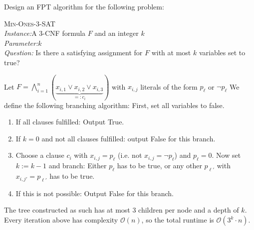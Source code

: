 \documentclass{article}
\begin{document}
\begin{exercise}
    Design an FPT algorithm for the following problem:
    \begin{mdframed} \textsc{Min-Ones-3-SAT} \\
        \textit{Instance:}A 3-CNF formula $F$ and an integer $k$\\
\textit{Parameter:}$k$\\
\textit{Question:} Is there a satisfying assignment for $F$ with at most $k$ variables set to true?
  \end{mdframed}
\end{exercise}
\begin{solving}
    Let $F = \bigwedge_{i=1}^n(\underbrace{x_{i,1}\lor x_{i,2}\lor x_{i,3}}_{=: c_i})$ with $x_{i,j}$ literals of the form $p_\ell$ or $\lnot p_\ell$
    We define the following branching algorithm: First, set all variables to false.
    \begin{enumerate}
        \item If all clauses fulfilled: Output True.
        \item If $k=0$ and not all clauses fulfilled: output False for this branch.
        \item Choose a clause $c_i$ with $x_{i,j} = p_\ell$ (i.e. not $x_{i,j} = \lnot p_\ell$) and $p_\ell = 0$. Now set $k:= k-1$ and branch: Either $p_{\ell}$ has to be true, or any other $p_{\ell'}$ with $x_{i,j'} = p_{\ell'}$ has to be true. 
        \item If this is not possible: Output False for this branch.
    \end{enumerate}
    The tree constructed as such has at most 3 children per node and a depth of $k$. Every iteration above has complexity $\mathcal O(n)$, so the total runtime is $\mathcal O(3^k\cdot n )$.
\end{solving}
\newpage
\end{document}
